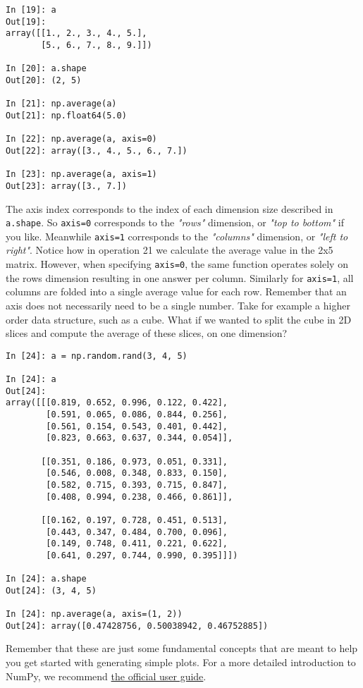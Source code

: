 \begin{lstlisting}[style=pythonstyle]
In [19]: a
Out[19]:
array([[1., 2., 3., 4., 5.],
       [5., 6., 7., 8., 9.]])

In [20]: a.shape
Out[20]: (2, 5)

In [21]: np.average(a)
Out[21]: np.float64(5.0)

In [22]: np.average(a, axis=0)
Out[22]: array([3., 4., 5., 6., 7.])

In [23]: np.average(a, axis=1)
Out[23]: array([3., 7.])
\end{lstlisting}

The axis index corresponds to the index of each dimension size described in
\texttt{a.shape}. So \texttt{axis=0} corresponds to the \textit{"rows"}
dimension, or \textit{"top to bottom"} if you like. Meanwhile \texttt{axis=1}
corresponds to the \textit{"columns"} dimension, or \textit{"left to right"}.
Notice how in operation 21 we calculate the average value in the 2x5 matrix.
However, when specifying \texttt{axis=0}, the same function operates solely on
the rows dimension resulting in one answer per column. Similarly for
\texttt{axis=1}, all columns are folded into a single average value for each
row. Remember that an axis does not necessarily need to be a single number.
Take for example a higher order data structure, such as a cube. What if we
wanted to split the cube in 2D slices and compute the average of these slices,
on one dimension?

\begin{lstlisting}[style=pythonstyle]
In [24]: a = np.random.rand(3, 4, 5)

In [24]: a
Out[24]:
array([[[0.819, 0.652, 0.996, 0.122, 0.422],
        [0.591, 0.065, 0.086, 0.844, 0.256],
        [0.561, 0.154, 0.543, 0.401, 0.442],
        [0.823, 0.663, 0.637, 0.344, 0.054]],

       [[0.351, 0.186, 0.973, 0.051, 0.331],
        [0.546, 0.008, 0.348, 0.833, 0.150],
        [0.582, 0.715, 0.393, 0.715, 0.847],
        [0.408, 0.994, 0.238, 0.466, 0.861]],

       [[0.162, 0.197, 0.728, 0.451, 0.513],
        [0.443, 0.347, 0.484, 0.700, 0.096],
        [0.149, 0.748, 0.411, 0.221, 0.622],
        [0.641, 0.297, 0.744, 0.990, 0.395]]])

In [24]: a.shape
Out[24]: (3, 4, 5)

In [24]: np.average(a, axis=(1, 2))
Out[24]: array([0.47428756, 0.50038942, 0.46752885])
\end{lstlisting}

Remember that these are just some fundamental concepts that are meant to help
you get started with generating simple plots. For a more detailed introduction
to NumPy, we recommend \href{https://numpy.org/doc/stable/user/index.html}
{the official user guide}.

